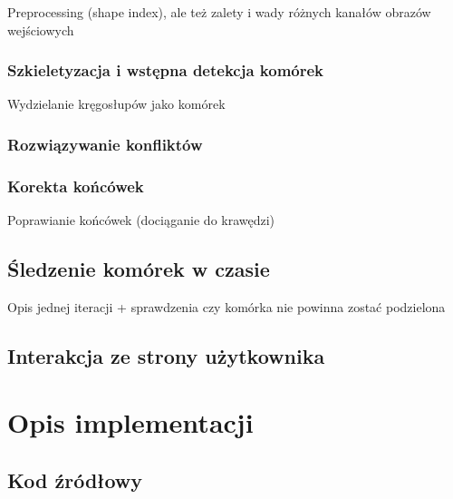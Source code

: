 \documentclass[declaration,shortabstract]{iithesis}
\begin{document}

Preprocessing (shape index), ale też zalety i wady różnych kanałów obrazów wejściowych

\subsection{Szkieletyzacja i wstępna detekcja komórek}


Wydzielanie kręgosłupów jako komórek

\subsection{Rozwiązywanie konfliktów}


\subsection{Korekta końcówek}


Poprawianie końcówek (dociąganie do krawędzi)

\section{Śledzenie komórek w czasie}
\label{sec:cell-tracking}

Opis jednej iteracji + sprawdzenia czy komórka nie powinna zostać podzielona

\section{Interakcja ze strony użytkownika}




\chapter{Opis implementacji}



\section{Kod źródłowy}
\end{document}
